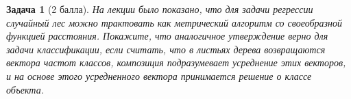 \documentclass[12pt,fleqn]{article}
\newtheorem{esProblem}{Задача}
\begin{document}
\begin{esProblem}[2 балла]
	На лекции было показано, что для задачи регрессии случайный лес можно трактовать как метрический алгоритм со своеобразной функцией расстояния. Покажите, что аналогичное утверждение верно для задачи классификации, если считать, что в листьях дерева возвращаются вектора частот классов, композиция подразумевает усреднение этих векторов, и на основе этого усредненного вектора принимается решение о классе объекта.
	
\end{esProblem}
\end{document}
